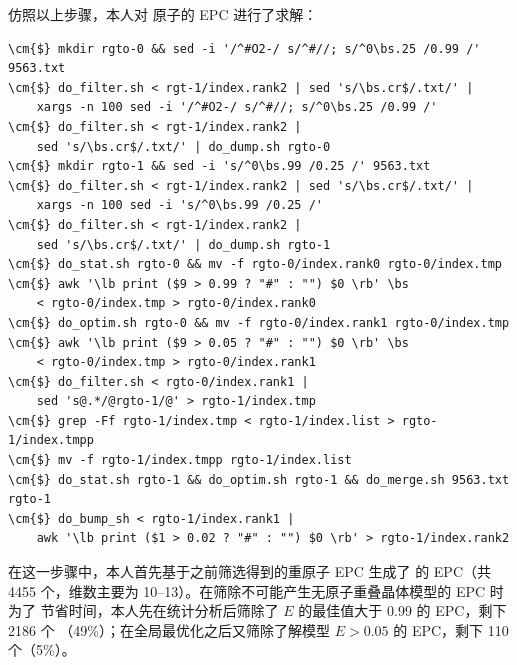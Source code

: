 仿照以上步骤，本人对  原子的 EPC 进行了求解：
\begin{Verbatim}
\cm{$} mkdir rgto-0 && sed -i '/^#O2-/ s/^#//; s/^0\bs.25 /0.99 /' 9563.txt
\cm{$} do_filter.sh < rgt-1/index.rank2 | sed 's/\bs.cr$/.txt/' |
	xargs -n 100 sed -i '/^#O2-/ s/^#//; s/^0\bs.25 /0.99 /'
\cm{$} do_filter.sh < rgt-1/index.rank2 |
	sed 's/\bs.cr$/.txt/' | do_dump.sh rgto-0
\cm{$} mkdir rgto-1 && sed -i 's/^0\bs.99 /0.25 /' 9563.txt
\cm{$} do_filter.sh < rgt-1/index.rank2 | sed 's/\bs.cr$/.txt/' |
	xargs -n 100 sed -i 's/^0\bs.99 /0.25 /'
\cm{$} do_filter.sh < rgt-1/index.rank2 |
	sed 's/\bs.cr$/.txt/' | do_dump.sh rgto-1
\cm{$} do_stat.sh rgto-0 && mv -f rgto-0/index.rank0 rgto-0/index.tmp
\cm{$} awk '\lb print ($9 > 0.99 ? "#" : "") $0 \rb' \bs
	< rgto-0/index.tmp > rgto-0/index.rank0
\cm{$} do_optim.sh rgto-0 && mv -f rgto-0/index.rank1 rgto-0/index.tmp
\cm{$} awk '\lb print ($9 > 0.05 ? "#" : "") $0 \rb' \bs
	< rgto-0/index.tmp > rgto-0/index.rank1
\cm{$} do_filter.sh < rgto-0/index.rank1 |
	sed 's@.*/@rgto-1/@' > rgto-1/index.tmp
\cm{$} grep -Ff rgto-1/index.tmp < rgto-1/index.list > rgto-1/index.tmpp
\cm{$} mv -f rgto-1/index.tmpp rgto-1/index.list
\cm{$} do_stat.sh rgto-1 && do_optim.sh rgto-1 && do_merge.sh 9563.txt rgto-1
\cm{$} do_bump_sh < rgto-1/index.rank1 |
	awk '\lb print ($1 > 0.02 ? "#" : "") $0 \rb' > rgto-1/index.rank2
\end{Verbatim}
在这一步骤中，本人首先基于之前筛选得到的重原子 EPC 生成了  的 EPC（共
4455 个，维数主要为 10--13）。在筛除不可能产生无原子重叠晶体模型的 EPC 时为了
节省时间，本人先在统计分析后筛除了 $E$ 的最佳值大于 0.99 的 EPC，剩下 2186 个
（49\%）；在全局最优化之后又筛除了解模型 $E > 0.05$ 的 EPC，剩下 110 个（5\%）。

